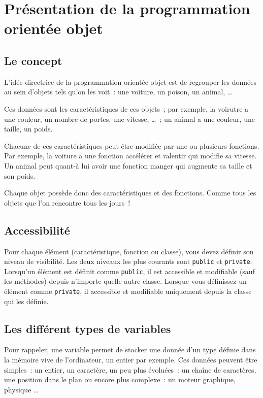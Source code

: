 \chapter{Présentation de la programmation orientée objet}

\section{Le concept}

L'idée directrice de la programmation orientée objet est de regrouper les données au sein d'objets tels qu'on les voit~: une voiture, un poison, un animal, \ldots

Ces données sont les caractéristiques de ces objets~; par exemple, la voirutre a une couleur, un nombre de portes, une vitesse, \ldots~; un animal a une couleur, une taille, un poids.

Chacune de ces caractéristiques peut être modifiée par une ou plusieurs fonctions. Par exemple, la voiture a une fonction accélérer et ralentir qui modifie sa vitesse. Un animal peut quant-à lui avoir une fonction manger qui augmente sa taille et son poids.

Chaque objet possède donc des caractéristiques et des fonctions. Comme tous les objets que l'on rencontre tous les jours~!


\section{Accessibilité}

Pour chaque élément (caractéristique, fonction ou classe), vous devez définir
son niveau de visibilité. Les deux niveaux les plus courants sont \verb+public+
et \verb+private+. Lorsqu'un élément est définit comme \verb+public+, il est
accessible et modifiable (sauf les méthodes) depuis n'importe quelle autre
classe. Lorsque vous définissez un élément comme \verb+private+, il accessible
et modifiable uniquement depuis la classe qui les définie.

\section{Les différent types de variables}

Pour rappeler, une variable permet de stocker une donnée d'un type définie
dans la mémoire vive de l'ordinateur, un entier par exemple. Ces données
peuvent être simples~: un entier, un caractère, un peu plus évoluées~: un
chaîne de caractères, une position dans le plan ou encore plus complexe~: un
moteur graphique, physique \ldots

